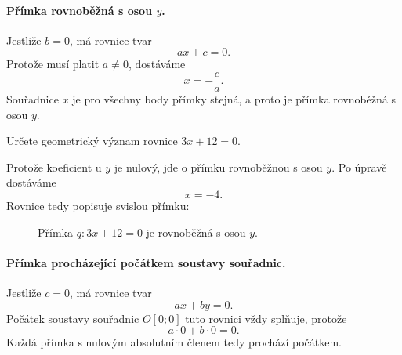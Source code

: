 \paragraph{Přímka rovnoběžná s osou $y$.}

Jestliže $b=0$, má rovnice tvar
\[
    ax+c=0.
\]
Protože musí platit $a\neq0$, dostáváme
\[
    x=-\frac{c}{a}.
\]
Souřadnice $x$ je pro všechny body přímky stejná, a proto je přímka
rovnoběžná s osou $y$.

\begin{example}
    Určete geometrický význam rovnice $3x+12=0$.

    Protože koeficient u $y$ je nulový, jde o přímku rovnoběžnou s osou $y$.
    Po úpravě dostáváme
    \[
        x=-4.
    \]
    Rovnice tedy popisuje svislou přímku:
    \begin{figure}[H]
         \centering
        \caption{Přímka $q:3x+12=0$ je rovnoběžná s osou $y$.}
        \label{fig:Line_parallel_y_axis}
    \end{figure}
\end{example}

\paragraph{Přímka procházející počátkem soustavy souřadnic.}

Jestliže $c=0$, má rovnice tvar
\[
    ax+by=0.
\]
Počátek soustavy souřadnic $O[0;0]$ tuto rovnici vždy splňuje, protože
\[
    a\cdot0+b\cdot0=0.
\]
Každá přímka s nulovým absolutním členem tedy prochází počátkem.

